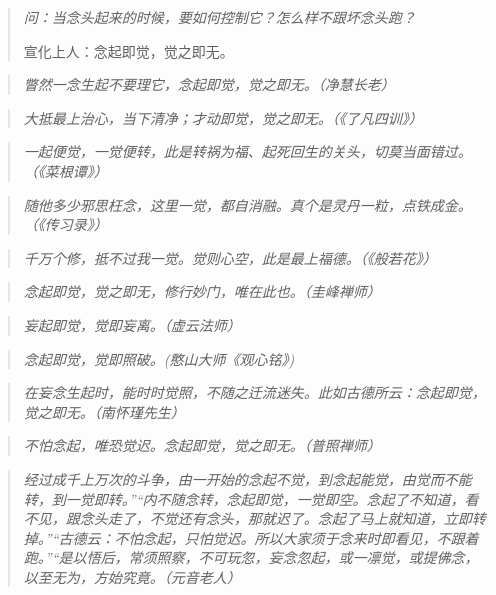 \begin{quotation}\it
    问：当念头起来的时候，要如何控制它？怎么样不跟坏念头跑？

    宣化上人：念起即觉，觉之即无。
\end{quotation}

\begin{quote}\it
    瞥然一念生起不要理它，念起即觉，觉之即无。（净慧长老）
\end{quote}

\begin{quote}\it
    大抵最上治心，当下清净；才动即觉，觉之即无。（《了凡四训》）
\end{quote}

\begin{quote}\it
    一起便觉，一觉便转，此是转祸为福、起死回生的关头，切莫当面错过。（《菜根谭》）
\end{quote}

\begin{quote}\it
    随他多少邪思枉念，这里一觉，都自消融。真个是灵丹一粒，点铁成金。（《传习录》）
\end{quote}

\begin{quote}\it
    千万个修，抵不过我一觉。觉则心空，此是最上福德。（《般若花》）
\end{quote}

\begin{quote}\it
    念起即觉，觉之即无，修行妙门，唯在此也。（圭峰禅师）
\end{quote}

\begin{quote}\it
    妄起即觉，觉即妄离。（虚云法师）
\end{quote}

\begin{quote}\it
    念起即觉，觉即照破。(憨山大师《观心铭》)
\end{quote}

\begin{quote}\it
    在妄念生起时，能时时觉照，不随之迁流迷失。此如古德所云：念起即觉，觉之即无。（南怀瑾先生）
\end{quote}

\begin{quote}\it
    不怕念起，唯恐觉迟。念起即觉，觉之即无。（普照禅师）
\end{quote}

\begin{quote}\it
    经过成千上万次的斗争，由一开始的念起不觉，到念起能觉，由觉而不能转，到一觉即转。”“内不随念转，念起即觉，一觉即空。念起了不知道，看不见，跟念头走了，不觉还有念头，那就迟了。念起了马上就知道，立即转掉。”“古德云：不怕念起，只怕觉迟。所以大家须于念来时即看见，不跟着跑。”“是以悟后，常须照察，不可玩忽，妄念忽起，或一凛觉，或提佛念，以至无为，方始究竟。（元音老人）
\end{quote}

